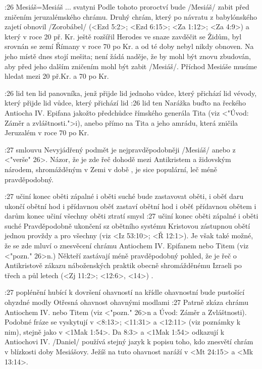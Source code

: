 :26 {Mesiáš}={Mesiáš ... svatyni} Podle tohoto proroctví bude \x/Mesiáš/ zabit před zničením jeruzalémského chrámu. Druhý chrám, který po návratu z babylónského zajetí obnovil \x/Zorobábel/ 
(<Ezd 5:2>; <Ezd 6:15>; <Za 1:12>; <Za 4:9>) a který v roce 20 př. Kr. ještě rozšířil Herodes ve snaze zavděčit se Židům, byl srovnán se zemí Římany v roce 70 po Kr. a od té doby nebyl nikdy obnoven. Na jeho místě dnes stojí mešita; není žádá naděje, že by mohl být znovu zbudován, aby před jeho dalším zničením mohl být zabit \x/Mesiáš/. Příchod Mesiáše musíme hledat mezi 20 př.Kr. a 70 po Kr.

:26
    {lid ten}   %
    {lid panovníka, jenž přijde}   %
    {lid jednoho vůdce, který přichází}   %
    {lid vévody, který přijde}   %
    {lid vůdce, který přichází}   %
    {lid}   %
:26 {lid ten} Narážka buďto na řeckého Antiocha IV. Epifana jakožto předchůdce římského generála Tita (viz <"Úvod: Záměr a zvláštnosti.">i), anebo přímo na Tita a jeho amrádu, která zničila Jeruzalém v roce 70 po Kr.

:27 {smlouvu} Nevyjádřený podmět  je nejpravděpodobněji \x/Mesiáš/ anebo  z <"verše" 26>. Názor, že je zde řeč dohodě mezi Antikristem a židovským národem, shromážděným v Zemi v době , je sice populární, leč méně pravděpodobný.

:27 {učiní konec oběti zápalné i oběti suché} {bude zastavovat oběti, i oběť daru} {ukončí obětní hod i přídavnou oběť} {zastaví obětní hod i oběť přídavnou} {obětem i darům konec učiní} {všechny oběti ztratí smysl}
:27 {učiní konec oběti zápalné i oběti suché} Pravděpodobně ukončení sz obětního systému Kristovou zástupnou obětí jednou provždy a pro všechny (viz <Iz 53:10>; <Ř 12:1>).
Je však také možné, že se zde mluví o znesvěcení chrámu  Antiochem IV. Epifanem nebo Titem (viz <"pozn." 26>n.) Někteří zastávají méně pravděpodobný pohled, že je řeč o Antikristově zákazu náboženských praktik obecně shromážděnému Izraeli po třech a půl letech (<Zj 11:2>; <12:6>, <14>)  .

:27
    {poplénění hubící}   %
    {k dovršení ohavností}   %
    {na křídle ohavnostní bude pustošící}   %
    {ohyzdné modly}   %
    {Otřesná ohavnost}   %
    {ohavnými modlami}   %
:27 {} Patrně zkáza chrámu Antiochem IV. nebo Titem (viz <"pozn." 26>n a Úvod: Záměr a Zvláštnosti). Podobné fráze se vyskytují v <8:13>; <11:31> a <12:11> (viz poznámky k nim), stejně jako v <1Mak 1:54>. \<Da 8:3> a <1Mak 1:54> odkazují k Antiochovi IV. \x/Daniel/ používá stejný jazyk k popisu toho, kdo znesvětí chrám v blízkosti doby Mesiášovy. Ježíš na tuto ohavnost naráží v <Mt 24:15> a <Mk 13:14>.


